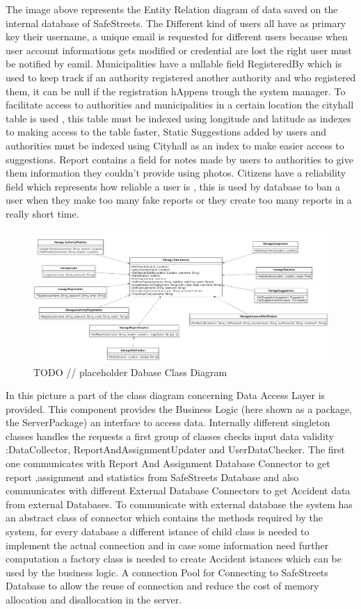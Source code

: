 The image above represents the Entity Relation diagram of data saved on the internal database of SafeStreets. The Different kind of users all have as primary key their username, a unique email is requested for different users because when user account informations gets modified or credential are lost the right user must be notified by eamil. Municipalities have a nullable field RegisteredBy which is used to keep track if an authority registered another authority and who registered them, it can be null if the registration hAppens trough the system manager. To facilitate access to authorities and municipalities in a certain location the cityhall table is used , this table must be indexed using longitude and latitude as indexes to making access to the table faster,
Static Suggestions added by users and authorities must be indexed using Cityhall as an index to make easier access to suggestions.
Report contains a field for notes made by users to authorities to give them information they couldn't provide using photos.
Citizens have a reliability field which represents how reliable a user is , this is used by database to ban a user when they make too many fake reports or they create too many reports in a really short time.
\begin{figure}[H]
\centering
\includegraphics[width=\textwidth]{Images/Interfaces.png}
\caption{\label{fig:ComWI}TODO // placeholder Dabase Class Diagram }
\end{figure}
In this picture a part of the class diagram concerning Data Access Layer is provided.
This component provides the Business Logic (here shown as a package, the ServerPackage) an interface to access data.
Internally different singleton classes handles the requests a first group of classes checks input data validity :DataCollector, ReportAndAssignmentUpdater and UserDataChecker. The first one communicates with Report And Assignment Database Connector to get report ,assignment and statistics from SafeStreets Database and also communicates with different External Database Connectors to get Accident data from external Databases. To communicate with external database the system has an abstract class of connector which contains the methods required by the system, for every database a different istance of child class  is needed to implement the actual connection and in case some information need further computation a factory class is needed to create Accident istances which can be used by the business logic. A connection Pool for Connecting to SafeStreets Database to allow the reuse of connection and reduce the cost of memory allocation and disallocation in the server.
